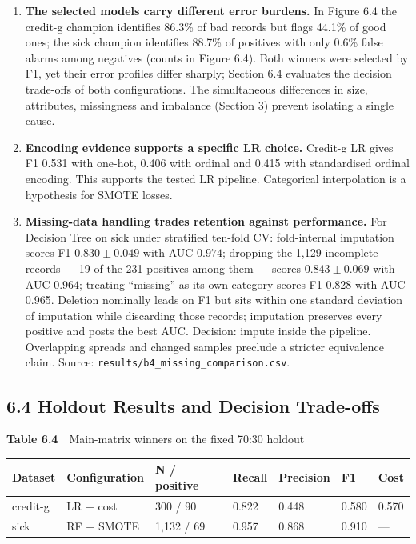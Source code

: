 \begin{enumerate}
\item \textbf{The selected models carry different error burdens.} In Figure 6.4 the
credit-g champion identifies 86.3\% of bad records but flags 44.1\% of good ones;
the sick champion identifies 88.7\% of positives with only 0.6\% false alarms among
negatives (counts in Figure 6.4). Both winners were selected by F1, yet their error
profiles differ sharply; Section 6.4 evaluates the decision trade-offs of both
configurations. The simultaneous differences in size, attributes, missingness and
imbalance (Section 3) prevent isolating a single cause.
\item \textbf{Encoding evidence supports a specific LR choice.} Credit-g LR gives F1
0.531 with one-hot, 0.406 with ordinal and 0.415 with standardised ordinal encoding.
This supports the tested LR pipeline. Categorical interpolation is a hypothesis for
SMOTE losses.
\item \textbf{Missing-data handling trades retention against performance.} For
Decision Tree on sick under stratified ten-fold CV: fold-internal imputation scores
F1 $0.830 \pm 0.049$ with AUC $0.974$; dropping the 1,129 incomplete records ---
19 of the 231 positives among them --- scores $0.843 \pm 0.069$ with AUC $0.964$;
treating ``missing'' as its own category scores F1 0.828 with AUC 0.965. Deletion
nominally leads on F1 but sits within one standard deviation of imputation while
discarding those records; imputation preserves every positive and posts the best AUC.
Decision: impute inside the pipeline. Overlapping spreads and changed samples
preclude a stricter equivalence claim. Source:
\texttt{results/b4\_missing\_comparison.csv}.
\end{enumerate}

\subsection*{6.4 Holdout Results and Decision Trade-offs}

\begin{center}
\begin{minipage}{\textwidth}
\centering
{\footnotesize\textbf{Table 6.4}\ \ Main-matrix winners on the fixed 70:30 holdout}

\footnotesize
\begin{tabular}{p{0.75in}p{1.15in}p{0.9in}p{0.65in}p{0.8in}p{0.55in}p{0.55in}}
\toprule
Dataset & Configuration & N / positive & Recall & Precision & F1 & Cost \\
\midrule
credit-g & LR + cost & 300 / 90 & 0.822 & 0.448 & 0.580 & 0.570 \\
sick & RF + SMOTE & 1,132 / 69 & 0.957 & 0.868 & 0.910 & --- \\
\bottomrule
\end{tabular}
\end{minipage}
\end{center}

